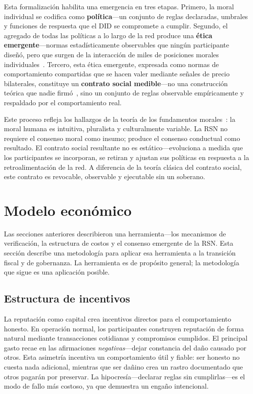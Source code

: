 \documentclass[11pt,a4paper,twocolumn]{article}
\begin{document}
Esta formalización habilita una emergencia en tres etapas. Primero, la moral individual se codifica como \textbf{política}---un conjunto de reglas declaradas, umbrales y funciones de respuesta que el DID se compromete a cumplir. Segundo, el agregado de todas las políticas a lo largo de la red produce una \textbf{ética emergente}---normas estadísticamente observables que ningún participante diseñó, pero que surgen de la interacción de miles de posiciones morales individuales~\cite{durkheim1893}. Tercero, esta ética emergente, expresada como normas de comportamiento compartidas que se hacen valer mediante señales de precio bilaterales, constituye un \textbf{contrato social medible}---no una construcción teórica que nadie firmó~\cite{rawls1971}, sino un conjunto de reglas observable empíricamente y respaldado por el comportamiento real.

Este proceso refleja los hallazgos de la teoría de los fundamentos morales~\cite{haidt2012}: la moral humana es intuitiva, pluralista y culturalmente variable. La RSN no requiere el consenso moral como insumo; produce el consenso conductual como resultado. El contrato social resultante no es estático---evoluciona a medida que los participantes se incorporan, se retiran y ajustan sus políticas en respuesta a la retroalimentación de la red. A diferencia de la teoría clásica del contrato social, este contrato es revocable, observable y ejecutable sin un soberano.

\section{Modelo económico}

Las secciones anteriores describieron una herramienta---los mecanismos de verificación, la estructura de costos y el consenso emergente de la RSN. Esta sección describe una metodología para aplicar esa herramienta a la transición fiscal y de gobernanza. La herramienta es de propósito general; la metodología que sigue es una aplicación posible.

\subsection{Estructura de incentivos}

La reputación como capital crea incentivos directos para el comportamiento honesto. En operación normal, los participantes construyen reputación de forma natural mediante transacciones cotidianas y compromisos cumplidos. El principal gasto recae en las afirmaciones \emph{negativas}---dejar constancia del daño causado por otros. Esta asimetría incentiva un comportamiento útil y fiable: ser honesto no cuesta nada adicional, mientras que ser dañino crea un rastro documentado que otros pagarán por preservar. La hipocresía---declarar reglas sin cumplirlas---es el modo de fallo más costoso, ya que demuestra un engaño intencional.
\end{document}
